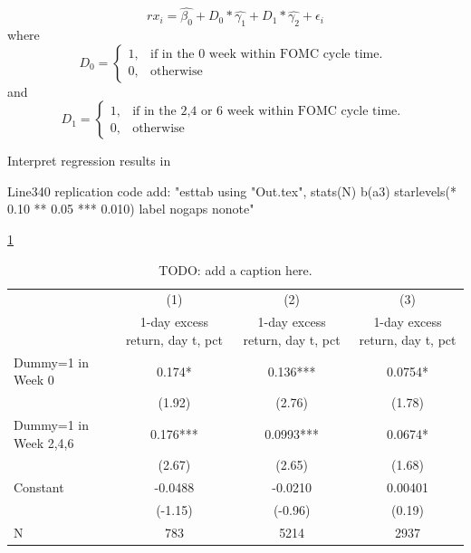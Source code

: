 \begin{equation}
	rx_{i}=\hat{\beta_{0}}+D_0*\hat{\gamma_{1}}+D_1*\hat{\gamma_{2}}+\epsilon_i
\end{equation}
where
\begin{equation}
    D_0=
    \begin{cases}
      1, & \text{if in the 0 week within FOMC cycle time. }\\
      0, & \text{otherwise}
    \end{cases}
\end{equation}
and
\begin{equation}
    D_1=
    \begin{cases}
      1, & \text{if in the 2,4 or 6 week within FOMC cycle time. } \\
      0, & \text{otherwise}
    \end{cases}
\end{equation}


Interpret regression results in  \parencite{cieslak_stock_2019}

Line340 replication code add:
"esttab using "Out.tex", stats(N) b(a3) starlevels(*  0.10 ** 0.05 *** 0.010) label nogaps nonote"

{


\ref{table_cies19_1}
\begin{table}
\begin{center}
\begin{adjustbox}{width=1\textwidth}
\def\sym#1{\ifmmode^{#1}\else\(^{#1}\)\fi}
\begin{tabular}{l*{3}{c}}

\hline\hline
                    &\multicolumn{1}{c}{(1)}&\multicolumn{1}{c}{(2)}&\multicolumn{1}{c}{(3)}\\
                    &\multicolumn{1}{c}{1-day excess return, day t, pct}&\multicolumn{1}{c}{1-day excess return, day t, pct}&\multicolumn{1}{c}{1-day excess return, day t, pct}\\
\hline
Dummy=1 in Week 0   &       0.174*  &       0.136***&      0.0754*  \\
                    &      (1.92)   &      (2.76)   &      (1.78)   \\
Dummy=1 in Week 2,4,6&       0.176***&      0.0993***&      0.0674*  \\
                    &      (2.67)   &      (2.65)   &      (1.68)   \\
Constant            &     -0.0488   &     -0.0210   &     0.00401   \\
                    &     (-1.15)   &     (-0.96)   &      (0.19)   \\
\hline
N                   &         783   &        5214   &        2937   \\
\hline\hline

\end{tabular}
\end{adjustbox}
\caption{\label{table_cies19_1}TODO: add a caption here.}
\end{center}
\end{table}

}




